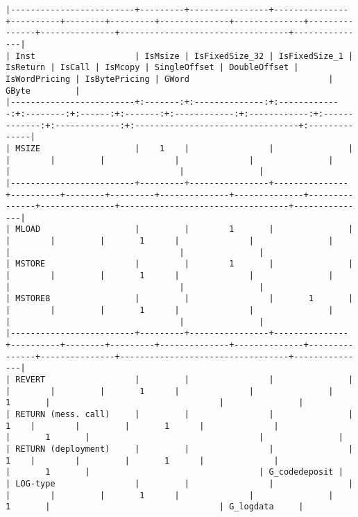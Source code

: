 \documentclass[varwidth=\maxdimen,margin=0.5cm,multi={verbatim}]{standalone}
\begin{document}
\begin{verbatim}
|-------------------------+---------+----------------+---------------+----------+--------+---------+--------------+--------------+---------------+---------------+----------------------------------+---------------|
| Inst                    | IsMsize | IsFixedSize_32 | IsFixedSize_1 | IsReturn | IsCall | IsMcopy | SingleOffset | DoubleOffset | IsWordPricing | IsBytePricing | GWord                            | GByte         |
|-------------------------+:-------:+:--------------:+:-------------:+:--------:+:------:+:-------:+:------------:+:------------:+:-------------:+:-------------:+:---------------------------------+:--------------|
| MSIZE                   |    1    |                |               |          |        |         |              |              |               |               |                                  |               |
|-------------------------+---------+----------------+---------------+----------+--------+---------+--------------+--------------+---------------+---------------+----------------------------------+---------------|
| MLOAD                   |         |        1       |               |          |        |         |       1      |              |               |               |                                  |               |
| MSTORE                  |         |        1       |               |          |        |         |       1      |              |               |               |                                  |               |
| MSTORE8                 |         |                |       1       |          |        |         |       1      |              |               |               |                                  |               |
|-------------------------+---------+----------------+---------------+----------+--------+---------+--------------+--------------+---------------+---------------+----------------------------------+---------------|
| REVERT                  |         |                |               |          |        |         |       1      |              |               |       1       |                                  |               |
| RETURN (mess. call)     |         |                |               |     1    |        |         |       1      |              |               |       1       |                                  |               |
| RETURN (deployment)     |         |                |               |     1    |        |         |       1      |              |               |       1       |                                  | G_codedeposit |
| LOG-type                |         |                |               |          |        |         |       1      |              |               |       1       |                                  | G_logdata     |

\end{verbatim}
\end{document}
